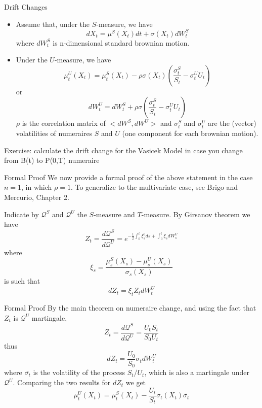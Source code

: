 \documentclass{beamer}
\begin{document}
\begin{frame}{Drift Changes}
	\begin{itemize}
		\item Assume that, under the $S$-measure, we have
		\begin{equation}
			dX_t = \mu^S(X_t)dt + \sigma(X_t)dW^S_t
		\end{equation}
		where $dW^S_t$ is n-dimensional standard brownian motion.
		\item Under the $U$-measure, we have
		\begin{equation}
			\mu^U_t(X_t) = \mu^S_t(X_t) - \rho\sigma(X_t)\left(\frac{\sigma^S_t}{S_t}-{\sigma^U_t}{U_t}\right) 
		\end{equation}
		or
		\begin{equation}
			dW^U_t = dW^S_t + \rho\sigma\left(\frac{\sigma^S_t}{S_t}-{\sigma^U_t}{U_t}\right) 
		\end{equation}
		$\rho$ is the correlation matrix of $<dW^S,dW^U>$ and $\sigma^S_t$ and $\sigma^U_t$ are the (vector) volatilities of numeraires $S$ and $U$ (one component for each brownian motion).
	\end{itemize}
Exercise: calculate the drift change for the Vasicek Model in case you change from B(t) to P(0,T) numeraire
\end{frame}

\begin{frame}{Formal Proof}
We now provide a formal proof of the above statement in the case $n=1$, in which $\rho=1$. To generalize to the multivariate case, see Brigo and Mercurio, Chapter 2.

Indicate by $\mathcal{Q}^S$ and $\mathcal{Q}^U$ the $S$-measure and $T$-measure. By Girsanov theorem we have
\begin{equation}
Z_t = \frac{d\mathcal{Q}^S}{d\mathcal{Q}^U} = e^{-\frac{1}{2}\int_0^t\xi_s^0 ds + \int_0^t\xi_s dW_s^U}
\end{equation}
where 
\begin{equation}
\xi_s=\frac{\mu^S_s(X_s)-\mu_s^U(X_s)}{\sigma_s(X_s)}
\end{equation}
is such that 
\begin{equation}
dZ_t=\xi_tZ_tdW_t^U
\end{equation}
\end{frame}

\begin{frame}{Formal Proof}
By the main theorem on numeraire change, and using the fact that $Z_t$ is $\mathcal{Q}^U$ martingale, 
\begin{equation}
Z_t = \frac{d\mathcal{Q}^S}{d\mathcal{Q}^U} = \frac{U_0S_t}{S_0U_t}
\end{equation}
thus
\begin{equation}
	dZ_t=\frac{U_0}{S_0}\bar{\sigma_t}dW_t^U
\end{equation}
where $\bar{\sigma_t}$ is the volatility of the process $S_t/U_t$, which is also a martingale under $\mathcal{Q}^U$. Comparing the two results for $dZ_t$ we get
\begin{equation}
\mu_t^U(X_t)=\mu_t^S(X_t)-\frac{U_t}{S_t}\sigma_t(X_t)\bar{\sigma_t}
\end{equation}
\end{frame}
\end{document}

